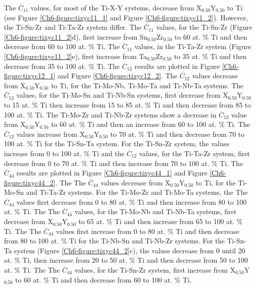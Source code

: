 The $\overline{C}_{11}$ values, for most of the Ti-X-Y systems, decrease from X$_{0.50}$Y$_{0.50}$ to Ti (see Figure \ref{Ch6-figure:tixyc11_1} and Figure \ref{Ch6-figure:tixyc11_2}). However, the Ti-Sn-Zr and Ti-Ta-Zr system differ. The $\overline{C}_{11}$ values, for the Ti-Sn-Zr (Figure \ref{Ch6-figure:tixyc11_2}d), first increase from Sn$_{0.50}$Zr$_{0.50}$ to 60 at. \% Ti and then decrease from 60 to 100 at. \% Ti. The $\overline{C}_{11}$ values, in the Ti-Ta-Zr system (Figure \ref{Ch6-figure:tixyc11_2}e), first increase from Ta$_{0.50}$Zr$_{0.50}$ to 35 at. \% Ti and then decrease from 35 to 100 at. \% Ti. The $\overline{C}_{12}$ results are plotted in Figure \ref{Ch6-figure:tixyc12_1} and Figure \ref{Ch6-figure:tixyc12_2}. The $\overline{C}_{12}$ values decrease from X$_{0.50}$Y$_{0.50}$ to Ti, for the Ti-Mo-Nb, Ti-Mo-Ta and Ti-Nb-Ta systems. The $\overline{C}_{12}$ values, for the Ti-Mo-Sn and Ti-Nb-Sn systems, first decrease from X$_{0.50}$Y$_{0.50}$ to 15 at. \% Ti then increase from 15 to 85 at. \% Ti and then decrease from 85 to 100 at. \% Ti. The Ti-Mo-Zr and Ti-Nb-Zr systems show a decrease in $\overline{C}_{12}$ value from X$_{0.50}$Y$_{0.50}$ to 60 at. \% Ti and then an increase from 60 to 100 at. \% Ti. The $\overline{C}_{12}$ values increase from X$_{0.50}$Y$_{0.50}$ to 70 at. \% Ti and then decrease from 70 to 100 at. \% Ti for the Ti-Sn-Ta system. For the Ti-Sn-Zr system, the values increase from 0 to 100 at. \% Ti and the $\overline{C}_{12}$ values, for the Ti-Ta-Zr system, first decrease from 0 to 70 at. \% Ti and then increase from 70 to 100 at. \% Ti. The $\overline{C}_{44}$ results are plotted in Figure \ref{Ch6-figure:tixyc44_1} and Figure \ref{Ch6-figure:tixyc44_2}. The The $\overline{C}_{44}$ values decrease from X$_{0.50}$Y$_{0.50}$ to Ti, for the Ti-Mo-Sn and Ti-Ta-Zr systems. For the Ti-Mo-Zr and Ti-Mo-Ta systems, the The $\overline{C}_{44}$ values first decrease from 0 to 80 at. \% Ti and then increase from 80 to 100 at. \% Ti. The The $\overline{C}_{44}$ values, for the Ti-Mo-Nb and Ti-Nb-Ta systems, first decrease from X$_{0.50}$Y$_{0.50}$ to 65 at. \% Ti and then increase from 65 to 100 at. \% Ti. The The $\overline{C}_{44}$ values first increase from 0 to 80 at. \% Ti and then decrease from 80 to 100 at. \% Ti for the Ti-Nb-Sn and Ti-Nb-Zr systems. For the Ti-Sn-Ta system (Figure \ref{Ch6-figure:tixyc44_2}c), the  values decrease from 0 until 20 at. \% Ti, then increase from 20 to 50 at. \% Ti and then decrease from 50 to 100 at. \% Ti. The The $\overline{C}_{44}$ values, for the Ti-Sn-Zr system, first increase from X$_{0.50}$Y$_{0.50}$ to 60 at. \% Ti and then decrease from 60 to 100 at. \% Ti.


